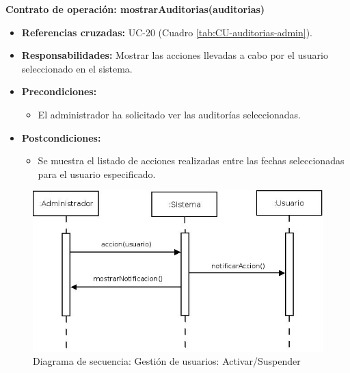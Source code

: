 \textbf{Contrato de operación: mostrarAuditorias(auditorias)}
\begin{itemize}
\item \textbf{Referencias cruzadas:} UC-20 (Cuadro \ref{tab:CU-auditorias-admin}).
\item \textbf{Responsabilidades:} Mostrar las acciones llevadas a cabo por el usuario seleccionado en el sistema.
\item \textbf{Precondiciones:} 
 \begin{itemize}
\item El administrador ha solicitado ver las auditorías seleccionadas.
\end {itemize}
\item \textbf{Postcondiciones:} 
 \begin{itemize}
\item Se muestra el listado de acciones realizadas entre las fechas seleccionadas para el usuario especificado.
\end {itemize}
\end {itemize}

\vspace{10mm}

\begin{figure}[H]
\centering
  \includegraphics[scale=.50]{img/secuencias/gestion-usuarios-activar-suspender.jpeg}
  \caption{Diagrama de secuencia: Gestión de usuarios: Activar/Suspender}
  \label{fig:secuencia-gestion-usuarios-activar-suspender}
\end{figure}

